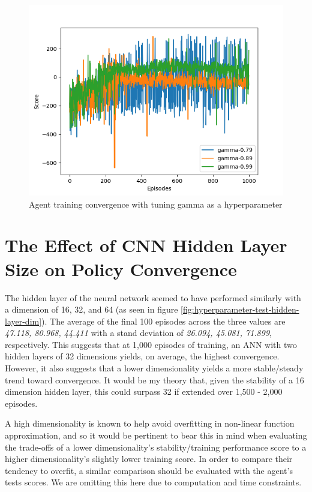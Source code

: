 \documentclass[conference]{IEEEtran}
\begin{document}
\begin{figure}[]
    \centering
    \includegraphics[scale=0.45]{figs/hyperparameter-test-gamma}
    \caption{Agent training convergence with tuning gamma as a hyperparameter}
    \label{fig:hyperparameter-test-gamma}
\end{figure}

\section{The Effect of CNN Hidden Layer Size on Policy Convergence}
The hidden layer of the neural network seemed to have performed similarly with a dimension of 16, 32, and 64 (as seen in figure \ref{fig:hyperparameter-test-hidden-layer-dim}). The average of the final 100 episodes across the three values are \textit{47.118, 80.968, 44.411} with a stand deviation of \textit{26.094, 45.081, 71.899}, respectively. This suggests that at 1,000 episodes of training, an ANN with two hidden layers of 32 dimensions yields, on average, the highest convergence. However, it also suggests that a lower dimensionality yields a more stable/steady trend toward convergence. It would be my theory that, given the stability of a 16 dimension hidden layer, this could surpass 32 if extended over 1,500 - 2,000 episodes.

A high dimensionality is known to help avoid overfitting in non-linear function approximation, and so it would be pertinent to bear this in mind when evaluating the trade-offs of a lower dimensionality’s stability/training performance score to a higher dimensionality’s slightly lower training score. In order to compare their tendency to overfit, a similar comparison should be evaluated with the agent's tests scores. We are omitting this here due to computation and time constraints.
\end{document}
